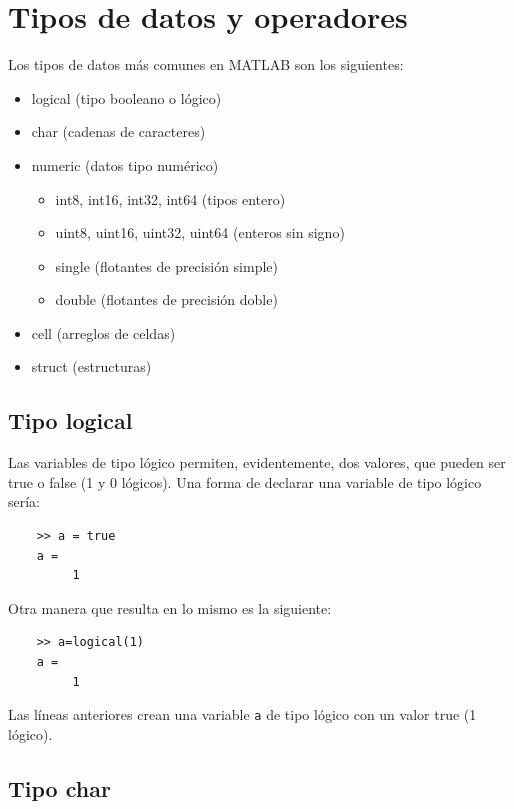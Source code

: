 \section{Tipos de datos y operadores}

Los tipos de datos más comunes en MATLAB son los siguientes:

\begin{itemize}
\item logical  (tipo booleano o lógico)
\item char (cadenas de caracteres)
\item numeric (datos tipo numérico)
\begin{itemize}
   \item int8, int16, int32, int64 (tipos entero)
   \item uint8, uint16, uint32, uint64  (enteros sin signo)
   \item single (flotantes de precisión simple)
   \item double  (flotantes de precisión doble)
\end{itemize}
\item cell (arreglos de celdas)
\item struct (estructuras)
\end{itemize}

\subsection{Tipo logical}

Las variables de tipo lógico permiten, evidentemente, dos valores, que pueden ser true o false (1 y 0 lógicos).
Una forma de declarar una variable de tipo lógico sería:

\begin{verbatim}
	>> a = true
	a =
	     1
\end{verbatim}
	     
Otra manera que resulta en lo mismo es la siguiente:

\begin{verbatim}
	>> a=logical(1)
	a =
	     1
\end{verbatim}

Las líneas anteriores crean una variable \texttt{a} de tipo lógico con un valor true (1 lógico).


\subsection{Tipo char}

